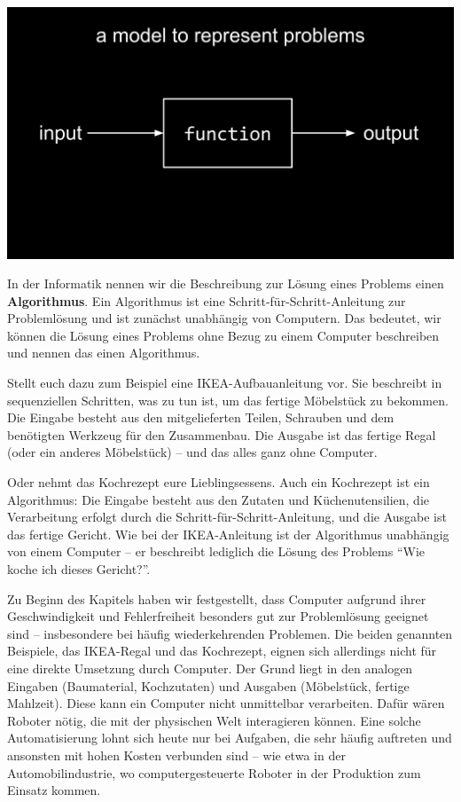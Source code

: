 \documentclass[
  ngerman,
  letterpaper,
  DIV=11]{scrreprt}
\begin{document}
\begin{center}
\includegraphics[width=1\linewidth,height=\textheight,keepaspectratio]{problem-solving_files/mediabag/problem_solving_inpu12.png}
\end{center}

In der Informatik nennen wir die Beschreibung zur Lösung eines Problems
einen \textbf{Algorithmus}. Ein Algorithmus ist eine
Schritt-für-Schritt-Anleitung zur Problemlösung und ist zunächst
unabhängig von Computern. Das bedeutet, wir können die Lösung eines
Problems ohne Bezug zu einem Computer beschreiben und nennen das einen
Algorithmus.

Stellt euch dazu zum Beispiel eine IKEA-Aufbauanleitung vor. Sie
beschreibt in sequenziellen Schritten, was zu tun ist, um das fertige
Möbelstück zu bekommen. Die Eingabe besteht aus den mitgelieferten
Teilen, Schrauben und dem benötigten Werkzeug für den Zusammenbau. Die
Ausgabe ist das fertige Regal (oder ein anderes Möbelstück) -- und das
alles ganz ohne Computer.

Oder nehmt das Kochrezept eure Lieblingsessens. Auch ein Kochrezept ist
ein Algorithmus: Die Eingabe besteht aus den Zutaten und
Küchenutensilien, die Verarbeitung erfolgt durch die
Schritt-für-Schritt-Anleitung, und die Ausgabe ist das fertige Gericht.
Wie bei der IKEA-Anleitung ist der Algorithmus unabhängig von einem
Computer -- er beschreibt lediglich die Lösung des Problems ``Wie koche
ich dieses Gericht?''.

Zu Beginn des Kapitels haben wir festgestellt, dass Computer aufgrund
ihrer Geschwindigkeit und Fehlerfreiheit besonders gut zur Problemlösung
geeignet sind -- insbesondere bei häufig wiederkehrenden Problemen. Die
beiden genannten Beispiele, das IKEA-Regal und das Kochrezept, eignen
sich allerdings nicht für eine direkte Umsetzung durch Computer. Der
Grund liegt in den analogen Eingaben (Baumaterial, Kochzutaten) und
Ausgaben (Möbelstück, fertige Mahlzeit). Diese kann ein Computer nicht
unmittelbar verarbeiten. Dafür wären Roboter nötig, die mit der
physischen Welt interagieren können. Eine solche Automatisierung lohnt
sich heute nur bei Aufgaben, die sehr häufig auftreten und ansonsten mit
hohen Kosten verbunden sind -- wie etwa in der Automobilindustrie, wo
computergesteuerte Roboter in der Produktion zum Einsatz kommen.
\end{document}
